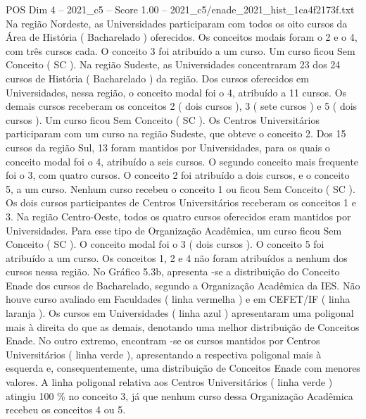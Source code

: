 \begin{textsample}{POS Dim 4 – 2021\_c5 – Score 1.00 – 2021\_c5/enade\_2021\_hist\_1ca4f2173f.txt}
Na região Nordeste, as Universidades participaram com todos os oito cursos da Área de História ( Bacharelado ) oferecidos.
Os conceitos modais foram o 2 e o 4, com três cursos cada.
O conceito 3 foi atribuído a um curso.
Um curso ficou Sem Conceito ( SC ).
Na região Sudeste, as Universidades concentraram 23 dos 24 cursos de História ( Bacharelado ) da região.
Dos cursos oferecidos em Universidades, nessa região, o conceito modal foi o 4, atribuído a 11 cursos.
Os demais cursos receberam os conceitos 2 ( dois cursos ), 3 ( sete cursos ) e 5 ( dois cursos ).
Um curso ficou Sem Conceito ( SC ).
Os Centros Universitários participaram com um curso na região Sudeste, que obteve o conceito 2.
Dos 15 cursos da região Sul, 13 foram mantidos por Universidades, para os quais o conceito modal foi o 4, atribuído a seis cursos.
O segundo conceito mais frequente foi o 3, com quatro cursos.
O conceito 2 foi atribuído a dois cursos, e o conceito 5, a um curso.
Nenhum curso recebeu o conceito 1 ou ficou Sem Conceito ( SC ).
Os dois cursos participantes de Centros Universitários receberam os conceitos 1 e 3.
Na região Centro-Oeste, todos os quatro cursos oferecidos eram mantidos por Universidades.
Para esse tipo de Organização Acadêmica, um curso ficou Sem Conceito ( SC ).
O conceito modal foi o 3 ( dois cursos ).
O conceito 5 foi atribuído a um curso.
Os conceitos 1, 2 e 4 não foram atribuídos a nenhum dos cursos nessa região.
No Gráfico 5.3b, apresenta -se a distribuição do Conceito Enade dos cursos de Bacharelado, segundo a Organização Acadêmica da IES.
Não houve curso avaliado em Faculdades ( linha vermelha ) e em CEFET/IF ( linha laranja ).
Os cursos em Universidades ( linha azul ) apresentaram uma poligonal mais à direita do que as demais, denotando uma melhor distribuição de Conceitos Enade.
No outro extremo, encontram -se os cursos mantidos por Centros Universitários ( linha verde ), apresentando a respectiva poligonal mais à esquerda e, consequentemente, uma distribuição de Conceitos Enade com menores valores.
A linha poligonal relativa aos Centros Universitários ( linha verde ) atingiu 100 \% no conceito 3, já que nenhum curso dessa Organização Acadêmica recebeu os conceitos 4 ou 5.

\end{textsample}
